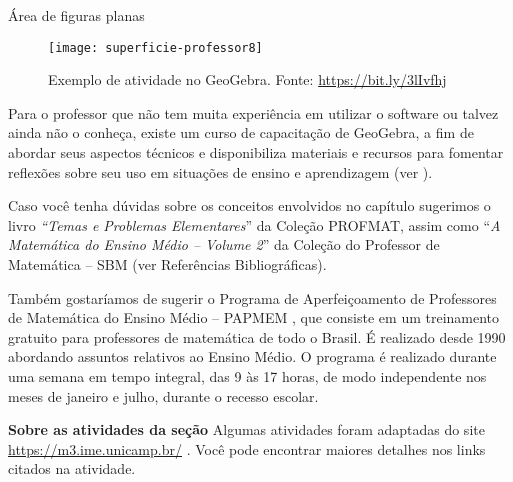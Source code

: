 \begin{paginatexto}{Área de figuras planas}
\begin{figure}[H]
\texttt{[image: superficie-professor8]}
\caption{Exemplo de atividade no GeoGebra. Fonte: \url{https://bit.ly/3lIvfhj}}
\end{figure}

Para o professor que não tem muita experiência em utilizar o software ou talvez ainda não o conheça, existe um curso de capacitação de GeoGebra, a fim de abordar seus aspectos técnicos e disponibiliza materiais e recursos para fomentar reflexões sobre seu uso em situações de ensino e aprendizagem (ver \cite{ogeogebra2020}).

Caso você tenha dúvidas sobre os conceitos envolvidos no capítulo sugerimos o livro \textit{“Temas e Problemas Elementares}” da Coleção PROFMAT, assim como “\textit{A Matemática do Ensino Médio – Volume 2}” da Coleção do Professor de Matemática – SBM (ver Referências Bibliográficas).

Também gostaríamos de sugerir o Programa de Aperfeiçoamento de Professores de Matemática do Ensino Médio – PAPMEM \citep{impa2020}, que consiste em um treinamento gratuito para professores de matemática de todo o Brasil. É realizado desde 1990 abordando assuntos relativos ao Ensino Médio. O programa é realizado durante uma semana em tempo integral, das 9 às 17 horas, de modo independente nos meses de janeiro e julho, durante o recesso escolar. 

\textbf{Sobre as atividades da seção} Algumas atividades foram adaptadas do site \url{https://m3.ime.unicamp.br/} . Você pode encontrar maiores detalhes nos links citados na atividade. 

\end{paginatexto}

